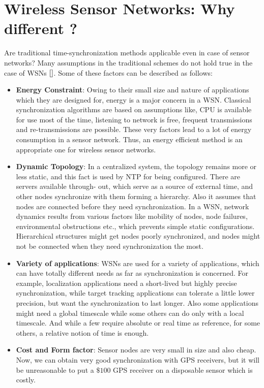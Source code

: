 \documentclass[a4paper,8pt]{report}
\begin{document}
\section{Wireless Sensor Networks: Why different ?}
     Are traditional time-synchronization methods applicable even in case of sensor networks? Many
assumptions in the traditional schemes do not hold true in the case
of WSNs $\cite{}$. Some of these factors can be described as
follows:
\begin{itemize}
\item \textbf{Energy Constraint}: Owing to their small size and nature of applications which they
      are designed for, energy is a major concern in a WSN. Classical synchronization
      algorithms are based on assumptions like, CPU is available for use most of the
      time, listening to network is free, frequent transmissions and re-transmissions are
      possible. These very factors lead to a lot of energy consumption in a sensor
      network. Thus, an energy efficient method is an appropriate
      one for wireless sensor networks.
\item \textbf{Dynamic Topology}: In a centralized system, the topology remains more or less static, and
      this fact is used by NTP for being configured. There are servers available through-
      out, which serve as a source of external time, and other nodes synchronize with
      them forming a hierarchy. Also it assumes that nodes are connected before they
      need synchronization. In a WSN, network dynamics results from various factors like
      mobility of nodes, node failures, environmental obstructions etc., which prevents
      simple static configurations. Hierarchical structures might get nodes poorly
      synchronized, and nodes might not be connected when they need synchronization the
      most.
\item \textbf{Variety of applications}: WSNs are used for a variety of applications, which can
      have totally different needs as far as synchronization is concerned. For example,
      localization applications need a short-lived but highly precise synchronization, while
      target tracking applications can tolerate a little lower precision, but want the
      synchronization to last longer. Also some applications might need a global timescale
      while some others can do only with a local timescale. And while a few require
      absolute or real time as reference, for some others, a relative notion of time is
      enough.
\item \textbf{Cost and Form factor}: Sensor nodes are very small in size and also cheap. Now,
      we can obtain very good synchronization with GPS receivers, but it will be
      unreasonable to put a $\$100$ GPS receiver on a disposable sensor
      which is costly.
\end{itemize}
\end{document}
